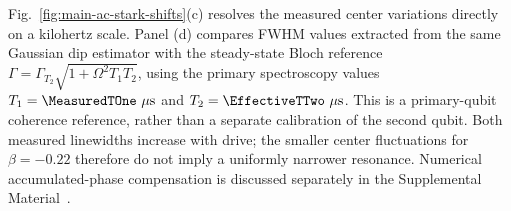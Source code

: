 Fig.~\ref{fig:main-ac-stark-shifts}(c) resolves the measured center
variations directly on a kilohertz scale. Panel (d) compares FWHM values
extracted from the same Gaussian dip estimator with the steady-state Bloch
reference $\Gamma=\Gamma_{T_2}\sqrt{1+\Omega^2T_1T_2}$, using the primary
spectroscopy values $T_1=\MeasuredTOne~\mu\mathrm{s}$ and
$T_2=\EffectiveTTwo~\mu\mathrm{s}$. This is a primary-qubit coherence
reference, rather than a separate calibration of the second qubit.
Both measured linewidths
increase with drive;
the smaller center fluctuations for $\beta=-0.22$ therefore do not imply
a uniformly narrower resonance. Numerical accumulated-phase compensation
is discussed separately in the Supplemental Material~\cite{SupplementalMaterial}.
